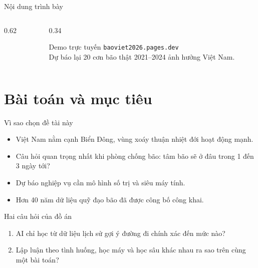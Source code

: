 \documentclass[aspectratio=169, 11pt, xcolor={table}]{beamer}
\begin{document}
\begin{frame}{Nội dung trình bày}
  \begin{columns}[c]
    \begin{column}{0.62\textwidth}
      \Large
      \tableofcontents[hideallsubsections]
    \end{column}
    \begin{column}{0.34\textwidth}
      \begin{block}{Demo trực tuyến}
        \centering\texttt{baoviet2026.pages.dev}\\[3pt]
        \small Dự báo lại 20 cơn bão thật 2021--2024 ảnh hưởng Việt Nam.
      \end{block}
    \end{column}
  \end{columns}
\end{frame}

\section{Bài toán và mục tiêu}

\begin{frame}{Vì sao chọn đề tài này}
  \begin{itemize}
    \item Việt Nam nằm cạnh Biển Đông, vùng xoáy thuận nhiệt đới hoạt động mạnh.
    \item Câu hỏi quan trọng nhất khi phòng chống bão:
          \alert{tâm bão sẽ ở đâu trong 1 đến 3 ngày tới?}
    \item Dự báo nghiệp vụ cần mô hình số trị và siêu máy tính.
    \item Hơn 40 năm dữ liệu quỹ đạo bão đã được công bố công khai.
  \end{itemize}
  \vspace{0.6em}
  \begin{block}{Hai câu hỏi của đồ án}
    \begin{enumerate}
      \item AI chỉ học từ dữ liệu lịch sử gợi ý đường đi chính xác đến mức nào?
      \item Lập luận theo tình huống, học máy và học sâu khác nhau ra sao trên
            cùng một bài toán?
    \end{enumerate}
  \end{block}
\end{frame}
\end{document}
